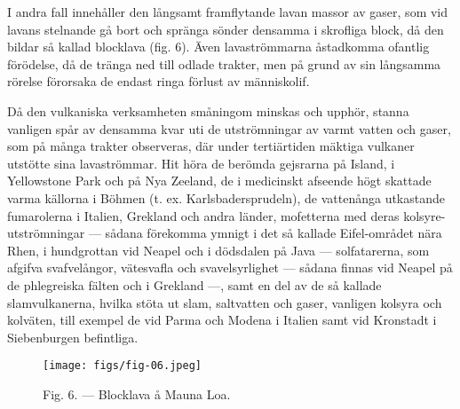 \documentclass[a4paper, 12pt, oneside, swedish]{article}
\begin{document}
I andra fall innehåller den långsamt framflytande lavan massor av gaser, som vid lavans stelnande gå bort och spränga sönder densamma i skrofliga block, då den bildar så kallad blocklava (fig. 6). Även lavaströmmarna åstadkomma ofantlig förödelse, då de tränga ned till odlade trakter, men på grund av sin långsamma rörelse förorsaka de endast ringa förlust av människolif.

Då den vulkaniska verksamheten småningom minskas och upphör, stanna vanligen spår av densamma kvar uti de utströmningar av varmt vatten och gaser, som på många trakter observeras, där under tertiärtiden mäktiga vulkaner utstötte sina lavaströmmar. Hit höra de berömda gejsrarna på Island, i Yellowstone Park och på Nya Zeeland, de i medicinskt afseende högt skattade varma källorna i Böhmen (t. ex. Karlsbadersprudeln), de vattenånga utkastande fumarolerna i Italien, Grekland och andra länder, mofetterna med deras kolsyre-utströmningar --- sådana förekomma ymnigt i det så kallade Eifel-området nära Rhen, i hundgrottan vid Neapel och i dödsdalen på Java --- solfatarerna, som afgifva svafvelångor, vätesvafla och svavelsyrlighet --- sådana finnas vid Neapel på de phlegreiska fälten och i Grekland ---, samt en del av de så kallade slamvulkanerna, hvilka stöta ut slam, saltvatten och gaser, vanligen kolsyra och kolväten, till exempel de vid Parma och Modena i Italien samt vid Kronstadt i Siebenburgen befintliga.

\begin{figure}[H]
\centering
\texttt{[image: figs/fig-06.jpeg]}
\caption{Fig. 6. --- Blocklava å Mauna Loa.}
\end{figure}
\end{document}
